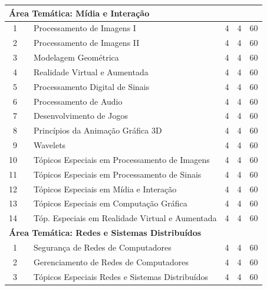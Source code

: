 \documentclass[
	12pt,				%
	openright,			%
  oneside,     %
	a4paper,			%
	chapter=TITLE,		%
	english,			%
	french,				%
	spanish,			%
	brazil				%
	]{abntex2}
\begin{document}
\begin{apendicesenv}
\begin{longtable}{r|r|l|r|r|r}
\multicolumn{6}{l}{\textbf{Área Temática: Mídia e Interação}} \\ \hline
    1     &       & Processamento de Imagens I & 4     & 4     & 60 \\ \hline
    2     &       & Processamento de Imagens II & 4     & 4     & 60 \\ \hline
    3     &       & Modelagem Geométrica & 4     & 4     & 60 \\ \hline 
    4     &       & Realidade Virtual e Aumentada & 4     & 4     & 60 \\ \hline 
    5     &       & Processamento Digital de Sinais & 4     & 4     & 60 \\ \hline
    6     &       & Processamento de Audio & 4     & 4     & 60 \\ \hline
    7     &       & Desenvolvimento de Jogos & 4     & 4     & 60 \\ \hline
    8     &       & Princípios da Animação Gráfica 3D & 4     & 4     & 60 \\ \hline
    9     &       & Wavelets & 4     & 4     & 60 \\ \hline
   10     &       & \small{Tópicos Especiais em Processamento de Imagens} & 4     & 4     & 60 \\ \hline
   11     &       & \small{Tópicos Especiais em Processamento de Sinais} & 4     & 4     & 60 \\ \hline
   12     &       & \small{Tópicos Especiais em Mídia e Interação} & 4     & 4     & 60 \\ \hline
   13     &       & \small{Tópicos Especiais em Computação Gráfica} & 4     & 4     & 60 \\ \hline
   14     &       & \small{Tóp. Especiais em Realidade Virtual e Aumentada} & 4     & 4     & 60 \\ \hline

\multicolumn{6}{l}{\textbf{Área Temática: Redes e Sistemas Distribuídos}} \\ \hline
    1     &       & Segurança de Redes de Computadores & 4     & 4     & 60 \\ \hline
    2     &       & Gerenciamento de Redes de Computadores & 4     & 4     & 60 \\ \hline
    3     &       & \small{Tópicos Especiais Redes e Sistemas Distribuídos} & 4     & 4     & 60 \\ \hline


\end{longtable}
\end{apendicesenv}
\end{document}
